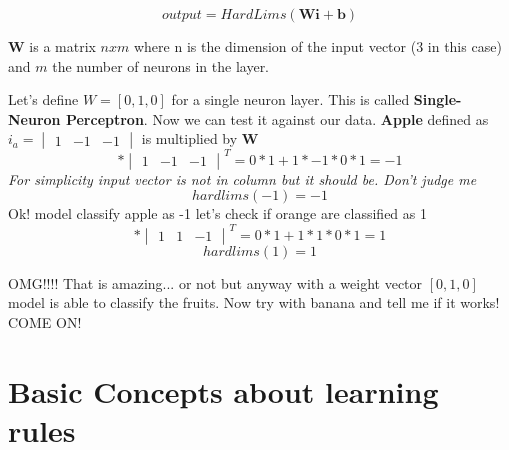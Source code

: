 \documentclass[12pt,a4paper,twoside,openright]{scrbook}
\begin{document}
\begin{equation}
output = HardLims(\textbf{W}\textbf{i} + \textbf{b})
\end{equation}

\textbf{W} is a matrix $nxm$ where n is the dimension of the input vector (3 in this case) and $m$ the number of neurons in the layer.

Let's define $W = [0, 1, 0]$ for a single neuron layer. This is called \textbf{Single-Neuron Perceptron}. Now we can test it against our data.
\newline
\textbf{Apple} defined as  $i_a = \begin{vmatrix}
1 & -1 & -1
\end{vmatrix}$ is multiplied by \textbf{W}
\begin{equation}
[0, 1, 0] * \begin{vmatrix}
1 & -1 & -1
\end{vmatrix}^T = 0*1 + 1*-1 * 0*1 = -1
\end{equation}
\textit{For simplicity input vector is not in column but it should be. Don't judge me}
\begin{equation}
hardlims(-1) = -1
\end{equation}
Ok! model classify apple as -1 let's check if orange are classified as 1
\begin{equation}
[0, 1, 0] * \begin{vmatrix}
1 & 1 & -1
\end{vmatrix}^T = 0*1 + 1*1 * 0*1 = 1
\end{equation}
\begin{equation}
hardlims(1) = 1
\end{equation}

OMG!!!! That is amazing... or not but anyway with a weight vector $[0, 1, 0]$ model is able to classify the fruits. Now try with banana and tell me if it works! COME ON!

\chapter{Basic Concepts about learning rules}

\end{document}
